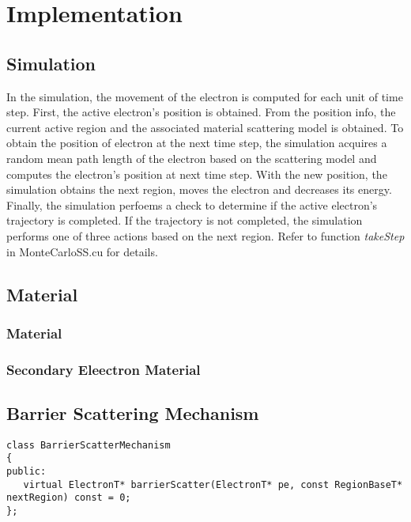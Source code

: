 \chapter{Implementation}
\section{Simulation}
In the simulation, the movement of the electron is computed for each unit of time step. First, the active electron's position is obtained. From the position info, the current active region and the associated material scattering model is obtained. To obtain the position of electron at the next time step, the simulation acquires a random mean path length of the electron based on the scattering model and computes the electron's position at next time step. With the new position, the simulation obtains the next region, moves the electron and decreases its energy. Finally, the simulation perfoems a check to determine if the active electron's trajectory is completed. If the trajectory is not completed, the simulation performs one of three actions based on the next region. Refer to function \emph{takeStep} in MonteCarloSS.cu for details.

\section{Material}\label{sec:impl_mat}
\subsection{Material}
\subsection{Secondary Eleectron Material}

\section{Barrier Scattering Mechanism}\label{sec:impl_barrierSM}
\begin{lstlisting}
class BarrierScatterMechanism
{
public:
   virtual ElectronT* barrierScatter(ElectronT* pe, const RegionBaseT* nextRegion) const = 0;
};
\end{lstlisting}
